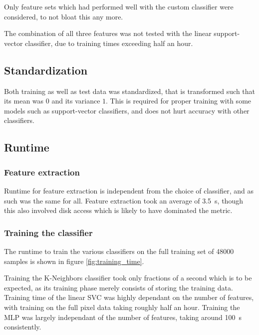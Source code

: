 \documentclass[a4paper]{scrreprt}
\begin{document}
Only feature sets which had performed well with the custom classifier were
considered, to not bloat this any more.

The combination of all three features was not tested with the linear
support-vector classifier, due to training times exceeding half an hour.

\subsection{Standardization}

Both training as well as test data was standardized, that is transformed such
that its mean was $0$ and its variance $1$. This is required for proper
training with some models such as support-vector classifiers, and does not hurt
accuracy with other classifiers.

\subsection{Runtime}

\subsubsection{Feature extraction}

Runtime for feature extraction is independent from the choice of classifier,
and as such was the same for all. Feature extraction took an average of
\SI{3.5}{\s}, though this also involved disk access which is likely to have
dominated the metric.

\subsubsection{Training the classifier}

The runtime to train the various classifiers on the full training set of 48000
samples is shown in figure \ref{fig:training_time}.

Training the K-Neighbors classifier took only fractions of a second which is to
be expected, as its training phase merely consists of storing the training
data. Training time of the linear SVC was highly dependant on the number of
features, with training on the full pixel data taking roughly half an hour.
Training the MLP was largely independant of the number of features, taking
around \SI{100}{\s} consistently.
\end{document}
